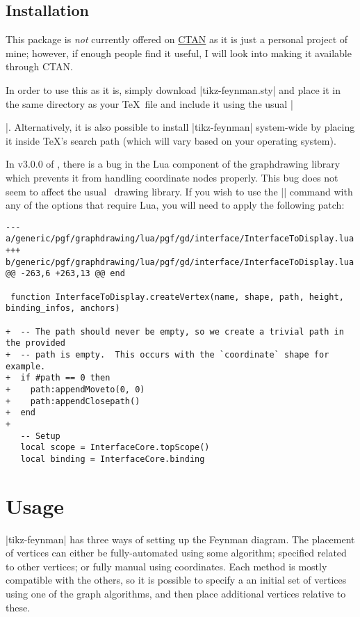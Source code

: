\documentclass[a4paper,final]{ltxdoc}
\begin{document}
\subsection{Installation}
\label{subsec:installation}

This package is \emph{not} currently offered on
\href{https://www.ctan.org}{CTAN} as it is just a personal project of mine;
however, if enough people find it useful, I will look into making it available
through CTAN.

In order to use this as it is, simply download |tikz-feynman.sty| and place it
in the same directory as your \TeX~file and include it using the usual
|\usepackage{tikz-feynman}|.  Alternatively, it is also possible to install
|tikz-feynman| system-wide by placing it inside \TeX's search path (which will
vary based on your operating system).

In v3.0.0 of \tikzname, there is a bug in the Lua component of the graphdrawing
library which prevents it from handling coordinate nodes properly.  This bug
does not seem to affect the usual \tikzname~drawing library.  If you wish to use the
|\graph| command with any of the options that require Lua, you will need to
apply the following patch:

\begin{verbatim}
--- a/generic/pgf/graphdrawing/lua/pgf/gd/interface/InterfaceToDisplay.lua
+++ b/generic/pgf/graphdrawing/lua/pgf/gd/interface/InterfaceToDisplay.lua
@@ -263,6 +263,13 @@ end

 function InterfaceToDisplay.createVertex(name, shape, path, height, binding_infos, anchors)

+  -- The path should never be empty, so we create a trivial path in the provided
+  -- path is empty.  This occurs with the `coordinate` shape for example.
+  if #path == 0 then
+    path:appendMoveto(0, 0)
+    path:appendClosepath()
+  end
+
   -- Setup
   local scope = InterfaceCore.topScope()
   local binding = InterfaceCore.binding
\end{verbatim}


\newpage
\section{Usage}
\label{sec:usage}

|tikz-feynman| has three ways of setting up the Feynman diagram.  The placement
of vertices can either be fully-automated using some algorithm; specified
related to other vertices; or fully manual using coordinates.  Each method is
mostly compatible with the others, so it is possible to specify a an initial
set of vertices using one of the graph algorithms, and then place additional
vertices relative to these.
\end{document}
